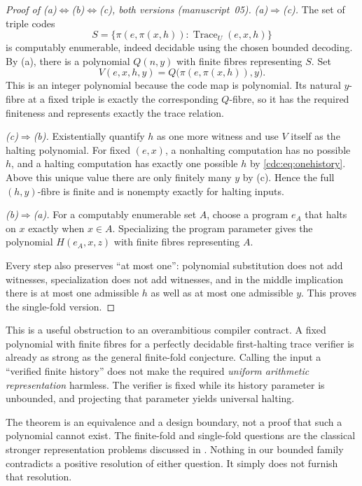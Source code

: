 \documentclass[11pt,a4paper]{article}
\theoremstyle{definition}
\theoremstyle{remark}
\begin{document}
\begin{proof}[Proof of (a)$\Leftrightarrow$(b)$\Leftrightarrow$(c), both versions (manuscript~05)]
\emph{(a)$\Rightarrow$(c).} The set of triple codes
\[
S=\{\pi(e,\pi(x,h)):\operatorname{Trace}_U(e,x,h)\}
\]
is computably enumerable, indeed decidable using the chosen bounded decoding. By (a), there is a polynomial $Q(n,y)$ with finite fibres representing $S$. Set
\[
V(e,x,h,y)=Q\bigl(\pi(e,\pi(x,h)),y\bigr).
\]
This is an integer polynomial because the code map is polynomial. Its natural $y$-fibre at a fixed triple is exactly the corresponding $Q$-fibre, so it has the required finiteness and represents exactly the trace relation.

\emph{(c)$\Rightarrow$(b).} Existentially quantify $h$ as one more witness and use $V$ itself as the halting polynomial. For fixed $(e,x)$, a nonhalting computation has no possible $h$, and a halting computation has exactly one possible $h$ by \eqref{cdc:eq:onehistory}. Above this unique value there are only finitely many $y$ by (c). Hence the full $(h,y)$-fibre is finite and is nonempty exactly for halting inputs.

\emph{(b)$\Rightarrow$(a).} For a computably enumerable set $A$, choose a program $e_A$ that halts on $x$ exactly when $x\in A$. Specializing the program parameter gives the polynomial $H(e_A,x,z)$ with finite fibres representing $A$.

Every step also preserves ``at most one'': polynomial substitution does not add witnesses, specialization does not add witnesses, and in the middle implication there is at most one admissible $h$ as well as at most one admissible $y$. This proves the single-fold version.
\end{proof}

This is a useful obstruction to an overambitious compiler contract. A fixed polynomial with finite fibres for a perfectly decidable first-halting trace verifier is already as strong as the general finite-fold conjecture. Calling the input a ``verified finite history'' does not make the required \emph{uniform arithmetic representation} harmless. The verifier is fixed while its history parameter is unbounded, and projecting that parameter yields universal halting.

The theorem is an equivalence and a design boundary, not a proof that such a polynomial cannot exist. The finite-fold and single-fold questions are the classical stronger representation problems discussed in \cite{mat2010,cco2024}. Nothing in our bounded family contradicts a positive resolution of either question. It simply does not furnish that resolution.
\end{document}
